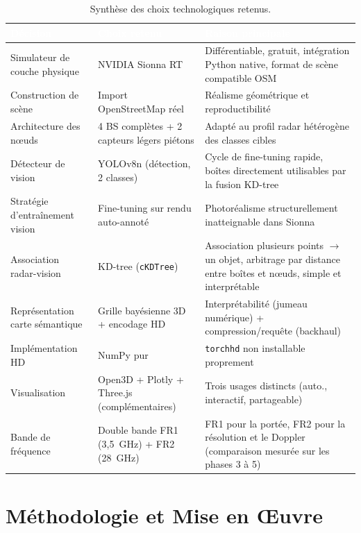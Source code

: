 \documentclass[12pt,a4paper,titlepage]{article}
\newcommand{\hd}[1]{\textcolor{white}{\textbf{#1}}}
\begin{document}
\begin{table}[H]
    \centering
    \caption{Synthèse des choix technologiques retenus.}
    \begin{tabularx}{\textwidth}{F{3.8cm}LL}
        \toprule
        \hd{Décision} & \hd{Choix retenu} & \hd{Raison principale} \\
        \midrule
        Simulateur de couche physique & NVIDIA Sionna RT & Différentiable, gratuit, intégration Python native, format de scène compatible OSM \\
        Construction de scène & Import OpenStreetMap réel & Réalisme géométrique et reproductibilité \\
        Architecture des n\oe uds & 4 BS complètes + 2 capteurs légers piétons & Adapté au profil radar hétérogène des classes cibles \\
        Détecteur de vision & YOLOv8n (détection, 2 classes) & Cycle de fine-tuning rapide, boîtes directement utilisables par la fusion KD-tree \\
        Stratégie d'entraînement vision & Fine-tuning sur rendu auto-annoté & Photoréalisme structurellement inatteignable dans Sionna \\
        Association radar-vision & KD-tree (\texttt{cKDTree}) & Association plusieurs points $\to$ un objet, arbitrage par distance entre boîtes et n\oe uds, simple et interprétable \\
        Représentation carte sémantique & Grille bayésienne 3D + encodage HD & Interprétabilité (jumeau numérique) + compression/requête (backhaul) \\
        Implémentation HD & NumPy pur & \texttt{torchhd} non installable proprement \\
        Visualisation & Open3D + Plotly + Three.js (complémentaires) & Trois usages distincts (auto., interactif, partageable) \\
        Bande de fréquence & Double bande FR1 (3,5~GHz) + FR2 (28~GHz) & FR1 pour la portée, FR2 pour la résolution et le Doppler (comparaison mesurée sur les phases 3 à 5) \\
        \bottomrule
    \end{tabularx}
\end{table}

\section{Méthodologie et Mise en \OE uvre}
\label{sec:methodologie}
\end{document}

